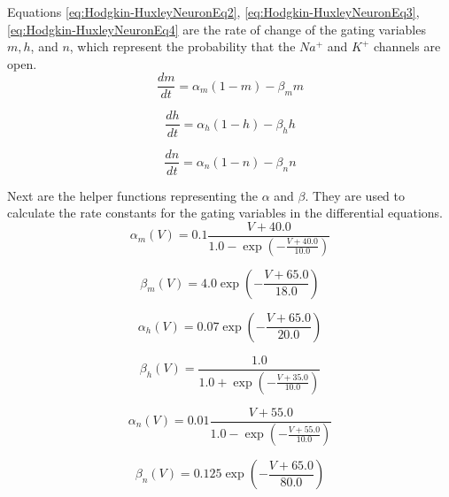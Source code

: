 			\par Equations \ref{eq:Hodgkin-HuxleyNeuronEq2}, \ref{eq:Hodgkin-HuxleyNeuronEq3}, \ref{eq:Hodgkin-HuxleyNeuronEq4} are the rate of change of the gating variables $m, h$, and $n$, which represent the probability that the $Na^+$ and $K^+$ channels are open.		
			\begin{equation}
				\label{eq:Hodgkin-HuxleyNeuronEq2}
				\frac{dm}{dt} = \alpha_m (1 - m) - \beta_m m
			\end{equation}
		
			\begin{equation}
				\label{eq:Hodgkin-HuxleyNeuronEq3}
				\frac{dh}{dt} = \alpha_h (1 - h) - \beta_h h
			\end{equation}
		
			\begin{equation}
				\label{eq:Hodgkin-HuxleyNeuronEq4}
				\frac{dn}{dt} = \alpha_n (1 - n) - \beta_n n
			\end{equation}
			
			
			\par Next are the helper functions representing the $\alpha$ and $\beta$. They are used to calculate the rate constants for the gating variables in the differential equations.	
			\begin{equation}
				\alpha_m(V) = 0.1 \frac{V + 40.0}{1.0 - \exp\left(-\frac{V + 40.0}{10.0}\right)}
			\end{equation}
		
			\begin{equation}
				\beta_m(V) = 4.0 \exp\left(-\frac{V + 65.0}{18.0}\right)
			\end{equation}
		
			\begin{equation}
				\alpha_h(V) = 0.07 \exp\left(-\frac{V + 65.0}{20.0}\right)
			\end{equation}
		
			\begin{equation}
				\beta_h(V) = \frac{1.0}{1.0 + \exp\left(-\frac{V + 35.0}{10.0}\right)}
			\end{equation}
		
			\begin{equation}
				\alpha_n(V) = 0.01 \frac{V + 55.0}{1.0 - \exp\left(-\frac{V + 55.0}{10.0}\right)}
			\end{equation}
	
			\begin{equation}
				\beta_n(V) = 0.125 \exp\left(-\frac{V + 65.0}{80.0}\right)
			\end{equation}
			
			
